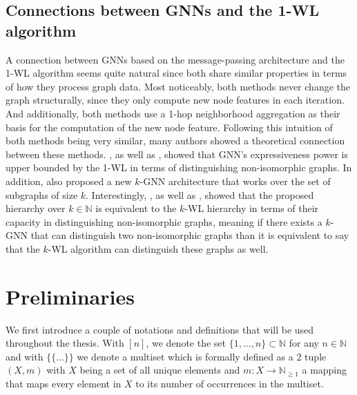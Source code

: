 \documentclass[11pt, dvipsnames, DIV=12]{scrreprt}
\theoremstyle{definition}
\newcommand{\MSopen}{\{\!\!\{}
\newcommand{\MSclose}{\}\!\!\}}
\begin{document}
\subsection{Connections between GNNs and the 1-WL algorithm}\label{sec:conn gnn and 1wl}
A connection between GNNs based on the message-passing architecture and the 1-WL algorithm seems quite natural since both share similar properties in terms of how they process graph data. Most noticeably, both methods never change the graph structurally, since they only compute new node features in each iteration. And additionally, both methods use a 1-hop neighborhood aggregation as their basis for the computation of the new node feature. Following this intuition of both methods being very similar, many authors showed a theoretical connection between these methods. \cite{Morris2018}, as well as \cite{Xu2018}, showed that GNN's expressiveness power is upper bounded by the 1-WL in terms of distinguishing non-isomorphic graphs. In addition, \cite{Morris2018} also proposed a new $k$-GNN architecture that works over the set of subgraphs of size $k$. Interestingly, \cite{Geerts2020}, as well as \cite{Gro2017}, showed that the proposed hierarchy over $k \in \mathbb{N}$ is equivalent to the $k$-WL hierarchy in terms of their capacity in distinguishing non-isomorphic graphs, meaning if there exists a $k$-GNN that can distinguish two non-isomorphic graphs than it is equivalent to say that the $k$-WL algorithm can distinguish these graphs as well.

\section{Preliminaries}
We first introduce a couple of notations and definitions that will be used throughout the thesis. With $[n]$, we denote the set $\{1, \ldots, n\} \subset \mathbb{N}$ for any $n \in \mathbb{N}$ and with $\MSopen \ldots \MSclose$ we denote a multiset which is formally defined as a 2 tuple $(X, m)$ with $X$ being a set of all unique elements and $m: X \rightarrow \mathbb{N}_{\geq 1}$ a mapping that maps every element in $X$ to its number of occurrences in the multiset.
\end{document}
